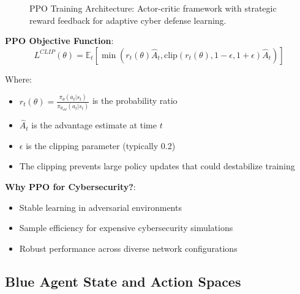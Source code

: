 \documentclass[11pt]{article}
\begin{document}
\begin{figure}[H]
\caption{PPO Training Architecture: Actor-critic framework with strategic reward feedback for adaptive cyber defense learning.}
\end{figure}

\begin{mathdetails}
\textbf{PPO Objective Function}:
$$L^{CLIP}(\theta) = \mathbb{E}_t\left[\min\left(r_t(\theta)\hat{A}_t, \text{clip}(r_t(\theta), 1-\epsilon, 1+\epsilon)\hat{A}_t\right)\right]$$

Where:
\begin{itemize}
\item $r_t(\theta) = \frac{\pi_\theta(a_t|s_t)}{\pi_{\theta_{old}}(a_t|s_t)}$ is the probability ratio
\item $\hat{A}_t$ is the advantage estimate at time $t$
\item $\epsilon$ is the clipping parameter (typically 0.2)
\item The clipping prevents large policy updates that could destabilize training
\end{itemize}

\textbf{Why PPO for Cybersecurity?}:
\begin{itemize}
\item Stable learning in adversarial environments
\item Sample efficiency for expensive cybersecurity simulations
\item Robust performance across diverse network configurations
\end{itemize}
\end{mathdetails}

\subsection{Blue Agent State and Action Spaces}
\end{document}
